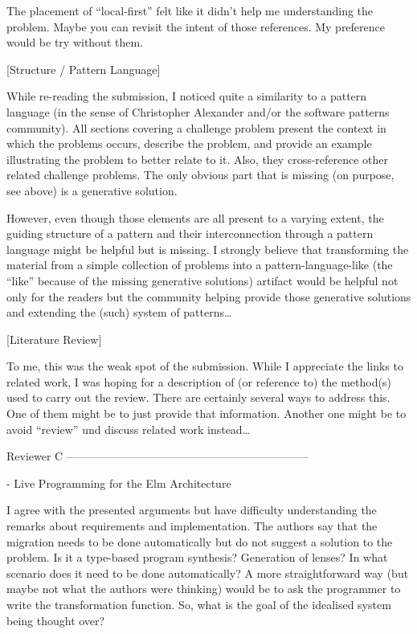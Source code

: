The placement of “local-first” felt like it didn’t help me understanding the problem. Maybe you can revisit the intent of those references. My preference would be try without them.

[Structure / Pattern Language]

While re-reading the submission, I noticed quite a similarity to a pattern language (in the sense of Christopher Alexander and/or the software patterns community). All sections covering a challenge problem present the context in which the problems occurs, describe the problem, and provide an example illustrating the problem to better relate to it. Also, they cross-reference other related challenge problems. The only obvious part that is missing (on purpose, see above) is a generative solution.

However, even though those elements are all present to a varying extent, the guiding structure of a pattern and their interconnection through a pattern language might be helpful but is missing. I strongly believe that transforming the material from a simple collection of problems into a pattern-language-like (the “like” because of the missing generative solutions) artifact would be helpful not only for the readers but the community helping provide those generative solutions and extending the (such) system of patterns…

[Literature Review]

To me, this was the weak spot of the submission. While I appreciate the links to related work, I was hoping for a description of (or reference to) the method(s) used to carry out the review. There are certainly several ways to address this. One of them might be to just provide that information. Another one might be to avoid “review” und discuss related work instead…


Reviewer C
-----------------------------------------------------------------

- Live Programming for the Elm Architecture

I agree with the presented arguments but have difficulty understanding the remarks about requirements and implementation. The authors say that the migration needs to be done automatically but do not suggest a solution to the problem. Is it a type-based program synthesis? Generation of lenses? In what scenario does it need to be done automatically? A more straightforward way (but maybe not what the authors were thinking) would be to ask the programmer to write the transformation function. So, what is the goal of the idealised system being thought over?

